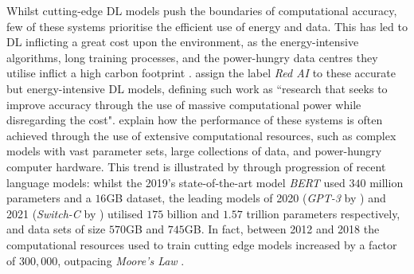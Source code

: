 \documentclass[a4paper, 11pt]{report}
\begin{document}
    Whilst cutting-edge DL models push the boundaries of computational accuracy, few of these systems prioritise the efficient use of energy and data. This has led to DL inflicting a great cost upon the environment, as the energy-intensive algorithms, long training processes, and the power-hungry data centres they utilise inflict a high carbon footprint \citep{lacoste-2019}. \citet{schwartz-2019} assign the label \emph{Red AI} to these accurate but energy-intensive DL models, defining such work as ``research that seeks to improve accuracy through the use of massive computational power while disregarding the cost". \citeauthor{schwartz-2019} explain how the performance of these systems is often achieved through the use of extensive computational resources, such as complex models with vast parameter sets, large collections of data, and power-hungry computer hardware. This trend is illustrated by \citet{bender-2021} through progression of recent language models: whilst the 2019's state-of-the-art model \emph{BERT} \citep{devlin-2018} used $340$ million parameters and a $16$GB dataset, the leading models of 2020 (\emph{GPT-3} by \citet{brown-2020}) and 2021 (\emph{Switch-C} by \citet{fedus-2021}) utilised $175$ billion and $1.57$ trillion parameters respectively, and data sets of size $570$GB and $745$GB. In fact, between 2012 and 2018 the computational resources used to train cutting edge models increased by a factor of $300,000$, outpacing \emph{Moore's Law} \citep{amodei-2018}.
\end{document}
